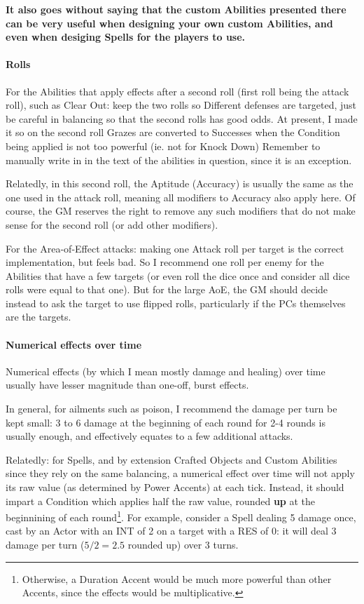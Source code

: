 \textbf{It also goes without saying that the custom Abilities presented there can be very useful when designing your own custom Abilities, and even when desiging Spells for the players to use.}


\paragraph{Rolls}

For the Abilities that apply effects after a second roll (first roll being the attack roll), such as Clear Out: keep the two rolls so Different defenses are targeted, just be careful in balancing so that the second rolls has good odds. At present, I made it so on the second roll Grazes are converted to Successes when the Condition being applied is not too powerful (ie. not for Knock Down) Remember to manually write in in the text of the abilities in question, since it is an exception.

Relatedly, in this second roll, the Aptitude (Accuracy) is usually the same as the one used in the attack roll, meaning all modifiers to Accuracy also apply here. Of course, the GM reserves the right to remove any such modifiers that do not make sense for the second roll (or add other modifiers).

For the Area-of-Effect attacks: making one Attack roll per target is the correct implementation, but feels bad. So I recommend one roll per enemy for the Abilities that have a few targets (or even roll the dice once and consider all dice rolls were equal to that one). But for the large AoE, the GM should decide instead to ask the target to use flipped rolls, particularly if the PCs themselves are the targets.


\paragraph{Numerical effects over time}

\label{numerical_effect_over_time}

Numerical effects (by which I mean mostly damage and healing) over time usually have lesser magnitude than one-off, burst effects.

In general, for ailments such as poison, I recommend the damage per turn be kept small: 3 to 6 damage at the beginning of each round for 2-4 rounds is usually enough, and effectively equates to a few additional attacks.

Relatedly: for Spells, and by extension Crafted Objects and Custom Abilities since they rely on the same balancing, a numerical effect over time will not apply its raw value (as determined by Power Accents) at each tick. Instead, it should impart a Condition which applies half the raw value, rounded \textbf{up} at the beginnining of each round\footnote{Otherwise, a Duration Accent would be much more powerful than other Accents, since the effects would be multiplicative.}. For example, consider a Spell dealing 5 damage once, cast by an Actor with an INT of 2 on a target with a RES of 0: it will deal 3 damage per turn ($5/2=2.5$ rounded up) over 3 turns.


